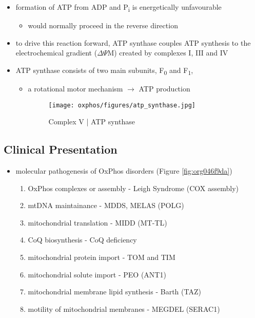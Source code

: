 \documentclass[12pt]{scrartcl}
\begin{document}
{\small{}}

\begin{itemize}
\item formation of ATP from ADP and P\textsubscript{i} is energetically unfavourable
\begin{itemize}
\item would normally proceed in the reverse direction
\end{itemize}

\item to drive this reaction forward, ATP synthase couples ATP synthesis
to the electrochemical gradient (\(\Delta \Psi\)M) created by complexes
I, III and IV
\item ATP synthase consists of two main subunits, F\textsubscript{0} and F\textsubscript{1},
\begin{itemize}
\item a rotational motor mechanism \(\to\) ATP production

\begin{figure}[htbp]
\centering
\texttt{[image: oxphos/figures/atp\_synthase.jpg]}
\caption{\label{fig:org43b2288}Complex V | ATP synthase}
\end{figure}
\end{itemize}
\end{itemize}

\subsection{Clinical Presentation}
\label{sec:org6ef96f2}
\begin{itemize}
\item molecular pathogenesis of OxPhos disorders (Figure \ref{fig:org046f9da})
\begin{enumerate}
\item OxPhos complexes or assembly - Leigh Syndrome (COX assembly)
\item mtDNA maintainance - MDDS, MELAS (POLG)
\item mitochondrial translation - MIDD (MT-TL)
\item CoQ biosynthesis - CoQ deficiency
\item mitochondrial protein import - TOM and TIM
\item mitochondrial solute import - PEO (ANT1)
\item mitochondrial membrane lipid synthesis - Barth (TAZ)
\item motility of mitochondrial membranes - MEGDEL (SERAC1)
\end{enumerate}
\end{itemize}
\end{document}

